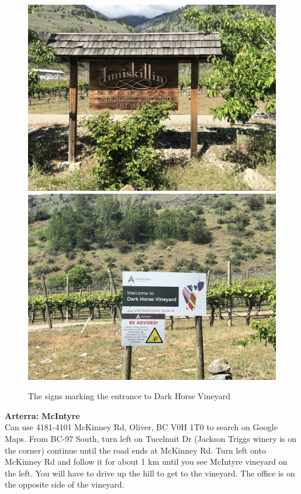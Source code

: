 \documentclass[11pt,letter]{article}
\begin{document}
\begin{figure} [h]
  \includegraphics[scale = .25]{darkhorseSign1.jpeg}
   \includegraphics[scale = .25]{darkhorseSign2.jpeg}
  \caption{The signs marking the entrance to Dark Horse Vineyard}
  \label{fig:DHsigns}
\end{figure}

{\bf Arterra: McIntyre} \\
Can use 4181-4101 McKinney Rd, Oliver, BC V0H 1T0 to search on Google Maps.
From BC-97 South, turn left on Tucelnuit Dr (Jackson Triggs winery is on the corner) continue until the road ends at McKinney Rd. Turn left onto McKinney Rd and follow it for about 1 km until you see McIntyre vineyard on the left. You will have to drive up the hill to get to the vineyard. The office is on the opposite side of the vineyard.
\end{document}
